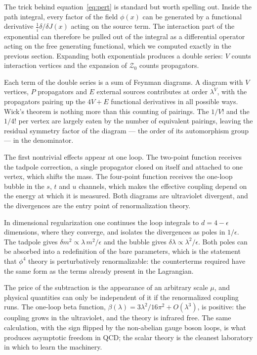 \documentclass[twocolumn]{article}
\begin{document}
The trick behind equation~\eqref{eq:pert} is standard but worth spelling
out. Inside the path integral, every factor of the field $\phi(x)$ can
be generated by a functional derivative $\tfrac{1}{i}\delta/\delta J(x)$
acting on the source term. The interaction part of the exponential can
therefore be pulled out of the integral as a differential operator
acting on the free generating functional, which we computed exactly in
the previous section. Expanding both exponentials produces a double
series: $V$ counts interaction vertices and the expansion of
$\mathcal{Z}_0$ counts propagators.

Each term of the double series is a sum of Feynman diagrams. A diagram
with $V$ vertices, $P$ propagators and $E$ external sources contributes
at order $\lambda^V$, with the propagators pairing up the $4V + E$
functional derivatives in all possible ways. Wick's theorem is nothing
more than this counting of pairings. The $1/V!$ and the $1/4!$ per
vertex are largely eaten by the number of equivalent pairings, leaving
the residual symmetry factor of the diagram --- the order of its
automorphism group --- in the denominator.

The first nontrivial effects appear at one loop. The two-point function
receives the tadpole correction, a single propagator closed on itself
and attached to one vertex, which shifts the mass. The four-point
function receives the one-loop bubble in the $s$, $t$ and $u$ channels,
which makes the effective coupling depend on the energy at which it is
measured. Both diagrams are ultraviolet divergent, and the divergences
are the entry point of renormalization theory.

In dimensional regularization one continues the loop integrals to
$d = 4 - \epsilon$ dimensions, where they converge, and isolates the
divergences as poles in $1/\epsilon$. The tadpole gives
$\delta m^2 \propto \lambda\, m^2/\epsilon$ and the bubble gives
$\delta\lambda \propto \lambda^2/\epsilon$. Both poles can be absorbed
into a redefinition of the bare parameters, which is the statement that
$\phi^4$ theory is perturbatively renormalizable: the counterterms
required have the same form as the terms already present in the
Lagrangian.

The price of the subtraction is the appearance of an arbitrary scale
$\mu$, and physical quantities can only be independent of it if the
renormalized coupling runs. The one-loop beta function,
$\beta(\lambda) = 3\lambda^2/16\pi^2 + O(\lambda^3)$, is positive: the
coupling grows in the ultraviolet, and the theory is infrared free. The
same calculation, with the sign flipped by the non-abelian gauge boson
loops, is what produces asymptotic freedom in QCD; the scalar theory is
the cleanest laboratory in which to learn the machinery.
\end{document}
